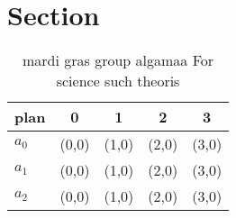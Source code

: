 \documentclass[a4paper]{article}
\begin{document}
\section{Section}

\begin{table}
\begin{adjustbox}{width=0.6\columnwidth}
\begin{tabular}{|l|l|l|l|l|}
\hline
\textbf{plan} & \multicolumn{1}{c|}{\textbf{0}} & \multicolumn{1}{c|}{\textbf{1}} & \multicolumn{1}{c|}{\textbf{2}} & \multicolumn{1}{c|}{\textbf{3}} \\ \hline
\textbf{$a_0$}  & (0,0) & (1,0) & (2,0) & (3,0) \\ \hline
\textbf{$a_1$}  & (0,0) & (1,0) & (2,0) & (3,0) \\ \hline
\textbf{$a_2$}  & (0,0) & (1,0) & (2,0) & (3,0) \\ \hline
\end{tabular}
\end{adjustbox}
\caption{mardi gras group algamaa For science such theoris
}
\end{table}
\end{document}
